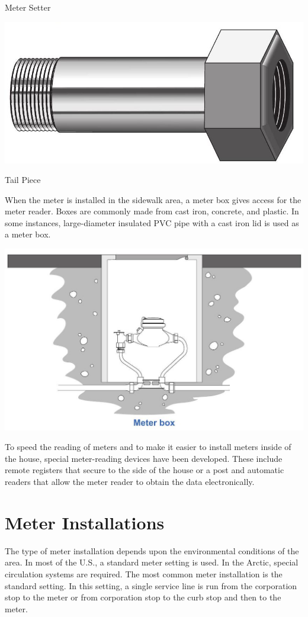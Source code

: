 \documentclass[10pt]{article}
\begin{document}
Meter Setter

\includegraphics[max width=\textwidth]{TailPiece}

Tail Piece

When the meter is installed in the sidewalk area, a meter box gives access for the meter reader. Boxes are commonly made from cast iron, concrete, and plastic. In some instances, large-diameter insulated PVC pipe with a cast iron lid is used as a meter box.

\includegraphics[max width=\textwidth]{MeterBox}

To speed the reading of meters and to make it easier to install meters inside of the house, special meter-reading devices have been developed. These include remote registers that secure to the side of the house or a post and automatic readers that allow the meter reader to obtain the data electronically.

\section{Meter Installations}
The type of meter installation depends upon the environmental conditions of the area. In most of the U.S., a standard meter setting is used. In the Arctic, special circulation systems are required. The most common meter installation is the standard setting. In this setting, a single service line is run from the corporation stop to the meter or from corporation stop to the curb stop and then to the meter.
\end{document}
